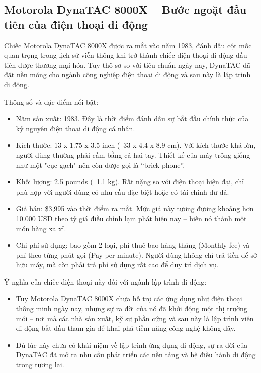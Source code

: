 \subsection{Motorola DynaTAC 8000X – Bước ngoặt đầu tiên của điện thoại di động}
\renewcommand{\labelitemi}{--}    
\begin{flushleft}
    \hspace*{0.8cm}Chiếc Motorola DynaTAC 8000X được ra mắt vào năm 1983, đánh dấu cột mốc quan trọng trong lịch sử viễn thông khi trở thành chiếc điện thoại di động đầu tiên được thương mại hóa. Tuy thô sơ so với tiêu chuẩn ngày nay, DynaTAC đã đặt nền móng cho ngành công nghiệp điện thoại di động và sau này là lập trình di động.
\end{flushleft}

\begin{flushleft}
  \hspace*{0.8cm}Thông số và đặc điểm nổi bật:
  \setlength{\leftmargini}{1.5cm}
  \begin{itemize}
      \item Năm sản xuất: 1983. Đây là thời điểm đánh dấu sự bắt đầu chính thức của kỷ nguyên điện thoại di động cá nhân.
      \item Kích thước: 13 x 1.75 x 3.5 inch (~33 x 4.4 x 8.9 cm). Với kích thước khá lớn, người dùng thường phải cầm bằng cả hai tay. Thiết kế của máy trông giống như một "cục gạch" nên còn được gọi là “brick phone”.
      \item Khối lượng: 2.5 pounds (~1.1 kg). Rất nặng so với điện thoại hiện đại, chỉ phù hợp với người dùng có nhu cầu đặc biệt hoặc có tài chính dư dả.
      \item Giá bán: \$3,995 vào thời điểm ra mắt. Mức giá này tương đương khoảng hơn 10.000 USD theo tỷ giá điều chỉnh lạm phát hiện nay – biến nó thành một món hàng xa xỉ.
      \item Chi phí sử dụng: bao gồm 2 loại, phí thuê bao hàng tháng (Monthly fee) và  phí theo từng phút gọi (Pay per minute). Người dùng không chỉ trả tiền để sở hữu máy, mà còn phải trả phí sử dụng rất cao để duy trì dịch vụ.
  \end{itemize}
\end{flushleft}

\begin{flushleft}
  \hspace*{0.8cm}Ý nghĩa của chiếc điện thoại này đối với ngành lập trình di động:
  \setlength{\leftmargini}{1.5cm}
  \begin{itemize}
      \item Tuy Motorola DynaTAC 8000X chưa hỗ trợ các ứng dụng như điện thoại thông minh ngày nay, nhưng sự ra đời của nó đã khởi động một thị trường mới – nơi mà các nhà sản xuất, kỹ sư phần cứng và sau này là lập trình viên di động bắt đầu tham gia để khai phá tiềm năng công nghệ không dây.
      \item Dù lúc này chưa có khái niệm về lập trình ứng dụng di động, sự ra đời của DynaTAC đã mở ra nhu cầu phát triển các nền tảng và hệ điều hành di động trong tương lai.
  \end{itemize}
\end{flushleft}

